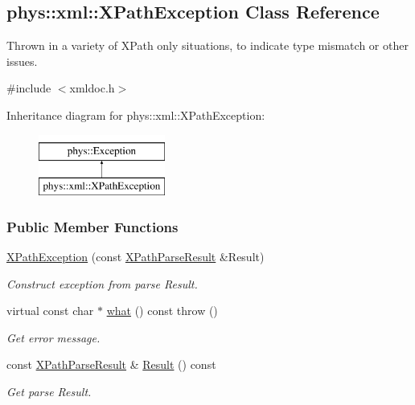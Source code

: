 \hypertarget{classphys_1_1xml_1_1XPathException}{
\subsection{phys::xml::XPathException Class Reference}
\label{classphys_1_1xml_1_1XPathException}
}


Thrown in a variety of XPath only situations, to indicate type mismatch or other issues.  




{\ttfamily \#include $<$xmldoc.h$>$}

Inheritance diagram for phys::xml::XPathException:\begin{figure}[H]
\begin{center}
\leavevmode
\includegraphics[height=2.000000cm]{classphys_1_1xml_1_1XPathException}
\end{center}
\end{figure}
\subsubsection*{Public Member Functions}
\begin{DoxyCompactItemize}
\item 
\hypertarget{classphys_1_1xml_1_1XPathException_a39d6511632945aa46b63e80f5364e959}{
\hyperlink{classphys_1_1xml_1_1XPathException_a39d6511632945aa46b63e80f5364e959}{XPathException} (const \hyperlink{structphys_1_1xml_1_1XPathParseResult}{XPathParseResult} \&Result)}
\label{classphys_1_1xml_1_1XPathException_a39d6511632945aa46b63e80f5364e959}

\begin{DoxyCompactList}\small\item\em Construct exception from parse Result. \item\end{DoxyCompactList}\item 
virtual const char $\ast$ \hyperlink{classphys_1_1xml_1_1XPathException_ab16319369cd5f40990300b1b22b8f6cb}{what} () const   throw ()
\begin{DoxyCompactList}\small\item\em Get error message. \item\end{DoxyCompactList}\item 
const \hyperlink{structphys_1_1xml_1_1XPathParseResult}{XPathParseResult} \& \hyperlink{classphys_1_1xml_1_1XPathException_a5410a12f705cbbc006175c08872b5749}{Result} () const 
\begin{DoxyCompactList}\small\item\em Get parse Result. \item\end{DoxyCompactList}\end{DoxyCompactItemize}


